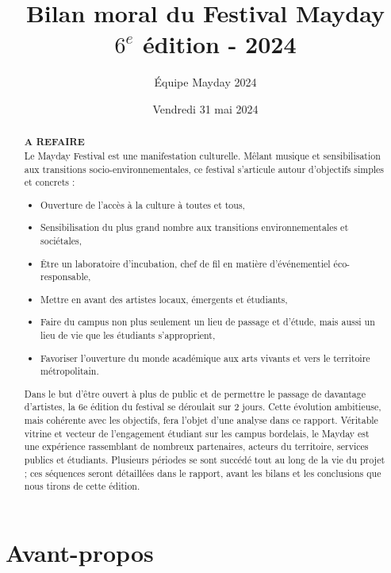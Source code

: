 \documentclass[12pt,a4paper]{report}
\title{Bilan moral du Festival Mayday \\ $6^e$ édition - 2024}
\author{Équipe Mayday 2024}
\date{Vendredi 31 mai 2024}
\begin{document}
\maketitle

\begin{abstract}
\textbf{A REFAIRE} \\
Le Mayday Festival est une manifestation culturelle. Mêlant musique et sensibilisation aux transitions socio-environnementales, ce festival s'articule autour d'objectifs simples et concrets :
\begin{itemize}
\item Ouverture de l’accès à la culture à toutes et tous,
\item Sensibilisation du plus grand nombre aux transitions environnementales et sociétales,
\item Être un laboratoire d’incubation, chef de fil en matière d’événementiel éco-responsable,
\item Mettre en avant des artistes locaux, émergents et étudiants,
\item Faire du campus non plus seulement un lieu de passage et d'étude, mais aussi un lieu de vie que les étudiants s'approprient,
\item \sloppy Favoriser l’ouverture du monde académique aux arts vivants et vers le territoire métropolitain.
\end{itemize}
Dans le but d’être ouvert à plus de public et de permettre le passage de davantage d’artistes, la 6e édition du festival se déroulait sur 2 jours. Cette évolution ambitieuse, mais cohérente avec les objectifs, fera l’objet d’une analyse dans ce rapport. Véritable vitrine et vecteur de l'engagement étudiant sur les campus bordelais, le Mayday est une expérience rassemblant de nombreux partenaires, acteurs du territoire, services publics et étudiants. Plusieurs périodes se sont succédé tout au long de la vie du projet ; ces séquences seront détaillées dans le rapport, avant les bilans et les conclusions que nous tirons de cette édition.
\end{abstract}

\tableofcontents

\newpage

\section*{Avant-propos}
\end{document}
